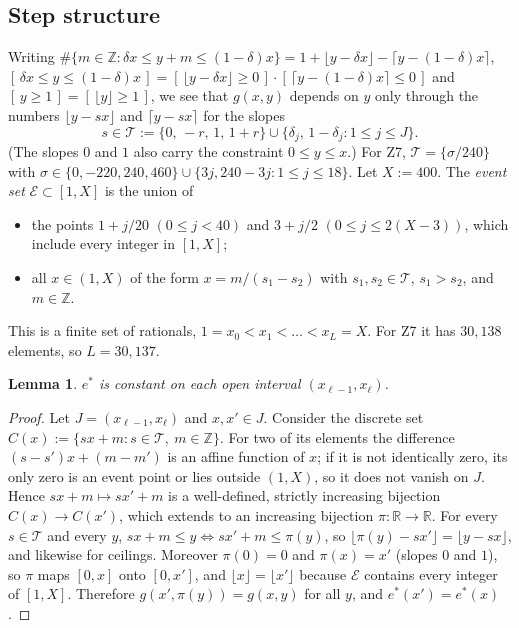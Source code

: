 \documentclass[11pt]{amsart}
\newtheorem{lemma}[theorem]{Lemma}
\theoremstyle{definition}
\theoremstyle{remark}
\numberwithin{equation}{section}
\newcommand{\ZZ}{\mathbb{Z}}
\newcommand{\RR}{\mathbb{R}}
\newcommand{\cE}{\mathcal{E}}
\newcommand{\ind}[1]{[\,#1\,]}
\begin{document}
\subsection{Step structure}
Writing $\#\{m\in\ZZ:\delta x\le y+m\le(1-\delta)x\}=1+\lfloor y-\delta x\rfloor-\lceil y-(1-\delta)x\rceil$,
$\ind{\delta x\le y\le(1-\delta)x}=\ind{\lfloor y-\delta x\rfloor\ge0}\cdot\ind{\lceil y-(1-\delta)x\rceil\le0}$
and $\ind{y\ge1}=\ind{\lfloor y\rfloor\ge1}$, we see that $g(x,y)$ depends on $y$ only through the numbers
$\lfloor y-s x\rfloor$ and $\lceil y-sx\rceil$ for the slopes
\[
  s\in\mathcal T:=\{0,\,-r,\,1,\,1+r\}\cup\{\delta_j,\,1-\delta_j:1\le j\le J\}.
\]
(The slopes $0$ and $1$ also carry the constraint $0\le y\le x$.) For Z7, $\mathcal T=\{\sigma/240\}$ with
$\sigma\in\{0,-220,240,460\}\cup\{3j,240-3j:1\le j\le18\}$. Let $X:=400$. The \emph{event set} $\cE\subset[1,X]$
is the union of
\begin{itemize}
\item the points $1+j/20$ $(0\le j<40)$ and $3+j/2$ $(0\le j\le 2(X-3))$, which include every integer in
  $[1,X]$;
\item all $x\in(1,X)$ of the form $x=m/(s_1-s_2)$ with $s_1,s_2\in\mathcal T$, $s_1>s_2$, and $m\in\ZZ$.
\end{itemize}
This is a finite set of rationals, $1=x_0<x_1<\dots<x_L=X$. For Z7 it has $30{,}138$ elements, so
$L=30{,}137$.

\begin{lemma}\label{lem:step}
$e^*$ is constant on each open interval $(x_{\ell-1},x_\ell)$.
\end{lemma}

\begin{proof}
Let $J=(x_{\ell-1},x_\ell)$ and $x,x'\in J$. Consider the discrete set $C(x):=\{sx+m:s\in\mathcal T,\ m\in\ZZ\}$. For
two of its elements the difference $(s-s')x+(m-m')$ is an affine function of $x$; if it is not identically zero,
its only zero is an event point or lies outside $(1,X)$, so it does not vanish on $J$. Hence $sx+m\mapsto sx'+m$
is a well-defined, strictly increasing bijection $C(x)\to C(x')$, which extends to an increasing bijection
$\pi:\RR\to\RR$. For every $s\in\mathcal T$ and every $y$, $sx+m\le y\iff sx'+m\le\pi(y)$, so
$\lfloor\pi(y)-sx'\rfloor=\lfloor y-sx\rfloor$, and likewise for ceilings. Moreover $\pi(0)=0$ and $\pi(x)=x'$
(slopes $0$ and $1$), so $\pi$ maps $[0,x]$ onto $[0,x']$, and $\lfloor x\rfloor=\lfloor x'\rfloor$ because $\cE$
contains every integer of $[1,X]$. Therefore $g(x',\pi(y))=g(x,y)$ for all $y$, and $e^*(x')=e^*(x)$.
\end{proof}
\end{document}
